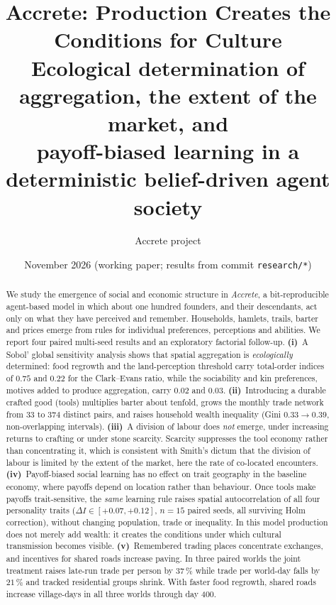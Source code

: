 \documentclass[11pt]{article}
\title{\textbf{Accrete: Production Creates the Conditions for Culture}\\[4pt]
\large Ecological determination of aggregation, the extent of the market, and\\
payoff-biased learning in a deterministic belief-driven agent society}
\author{Accrete project}
\date{November 2026 \quad\textcolor{muted}{(working paper; results from commit \texttt{research/*})}}
\theoremstyle{definition}
\newcommand{\1}{\mathbf{1}}
\begin{document}
\maketitle

\begin{abstract}
\noindent
We study the emergence of social and economic structure in \emph{Accrete}, a bit-reproducible agent-based model in which about one hundred founders, and their descendants, act only on what they have perceived and remember. Households, hamlets, trails, barter and prices emerge from rules for individual preferences, perceptions and abilities. We report four paired multi-seed results and an exploratory factorial follow-up.
\textbf{(i)}~A Sobol' global sensitivity analysis shows that spatial aggregation is \emph{ecologically} determined: food regrowth and the land-perception threshold carry total-order indices of $0.75$ and $0.22$ for the Clark--Evans ratio, while the sociability and kin preferences, motives added to produce aggregation, carry $0.02$ and $0.03$.
\textbf{(ii)}~Introducing a durable crafted good (tools) multiplies barter about tenfold, grows the monthly trade network from $33$ to $374$ distinct pairs, and raises household wealth inequality (Gini $0.33\!\to\!0.39$, non-overlapping intervals).
\textbf{(iii)}~A division of labour does \emph{not} emerge, under increasing returns to crafting or under stone scarcity. Scarcity suppresses the tool economy rather than concentrating it, which is consistent with Smith's dictum that the division of labour is limited by the extent of the market, here the rate of co-located encounters.
\textbf{(iv)}~Payoff-biased social learning has no effect on trait geography in the baseline economy, where payoffs depend on location rather than behaviour. Once tools make payoffs trait-sensitive, the \emph{same} learning rule raises spatial autocorrelation of all four personality traits ($\Delta I \in [+0.07, +0.12]$, $n=15$ paired seeds, all surviving Holm correction), without changing population, trade or inequality. In this model production does not merely add wealth: it creates the conditions under which cultural transmission becomes visible.
\textbf{(v)}~Remembered trading places concentrate exchanges, and incentives for shared roads increase paving. In three paired worlds the joint treatment raises late-run trade per person by $37\,\%$ while trade per world-day falls by $21\,\%$ and tracked residential groups shrink. With faster food regrowth, shared roads increase village-days in all three worlds through day 400.
\end{abstract}
\end{document}
